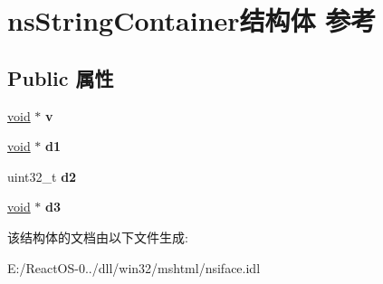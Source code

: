 \hypertarget{structns_string_container}{}\section{ns\+String\+Container结构体 参考}
\label{structns_string_container}
\subsection*{Public 属性}
\begin{DoxyCompactItemize}
\item 
\mbox{\label{structns_string_container_a219d3e9431034222a20a5d2653a20406}} 
\hyperlink{interfacevoid}{void} $\ast$ {\bfseries v}
\item 
\mbox{\label{structns_string_container_a5704dc788cd4e5062c088215500a129d}} 
\hyperlink{interfacevoid}{void} $\ast$ {\bfseries d1}
\item 
\mbox{\label{structns_string_container_a3934db7377b21237d36b0fa8ea85bb6d}} 
uint32\+\_\+t {\bfseries d2}
\item 
\mbox{\label{structns_string_container_a99a09698d1f6196e1e8016a51c8b6df1}} 
\hyperlink{interfacevoid}{void} $\ast$ {\bfseries d3}
\end{DoxyCompactItemize}


该结构体的文档由以下文件生成\+:\begin{DoxyCompactItemize}
\item 
E\+:/\+React\+O\+S-\/0../dll/win32/mshtml/nsiface.\+idl\end{DoxyCompactItemize}
